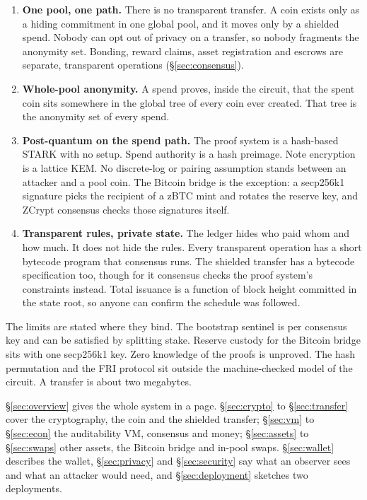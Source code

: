 \documentclass[twocolumn,10pt]{article}
\begin{document}
\begin{enumerate}
\item \textbf{One pool, one path.} There is no transparent transfer. A coin exists only as a hiding commitment in one global pool, and it moves only by a shielded spend. Nobody can opt out of privacy on a transfer, so nobody fragments the anonymity set. Bonding, reward claims, asset registration and escrows are separate, transparent operations (\S\ref{sec:consensus}).

\item \textbf{Whole-pool anonymity.} A spend proves, inside the circuit, that the spent coin sits somewhere in the global tree of every coin ever created. That tree is the anonymity set of every spend.

\item \textbf{Post-quantum on the spend path.} The proof system is a hash-based STARK with no setup. Spend authority is a hash preimage. Note encryption is a lattice KEM. No discrete-log or pairing assumption stands between an attacker and a pool coin. The Bitcoin bridge is the exception: a secp256k1 signature picks the recipient of a zBTC mint and rotates the reserve key, and ZCrypt consensus checks those signatures itself.

\item \textbf{Transparent rules, private state.} The ledger hides who paid whom and how much. It does not hide the rules. Every transparent operation has a short bytecode program that consensus runs. The shielded transfer has a bytecode specification too, though for it consensus checks the proof system's constraints instead. Total issuance is a function of block height committed in the state root, so anyone can confirm the schedule was followed.
\end{enumerate}

The limits are stated where they bind. The bootstrap sentinel is per consensus key and can be satisfied by splitting stake. Reserve custody for the Bitcoin bridge sits with one secp256k1 key. Zero knowledge of the proofs is unproved. The hash permutation and the FRI protocol sit outside the machine-checked model of the circuit. A transfer is about two megabytes.

\S\ref{sec:overview} gives the whole system in a page. \S\ref{sec:crypto} to \S\ref{sec:transfer} cover the cryptography, the coin and the shielded transfer; \S\ref{sec:vm} to \S\ref{sec:econ} the auditability VM, consensus and money; \S\ref{sec:assets} to \S\ref{sec:swaps} other assets, the Bitcoin bridge and in-pool swaps. \S\ref{sec:wallet} describes the wallet, \S\ref{sec:privacy} and \S\ref{sec:security} say what an observer sees and what an attacker would need, and \S\ref{sec:deployment} sketches two deployments.
\end{document}

